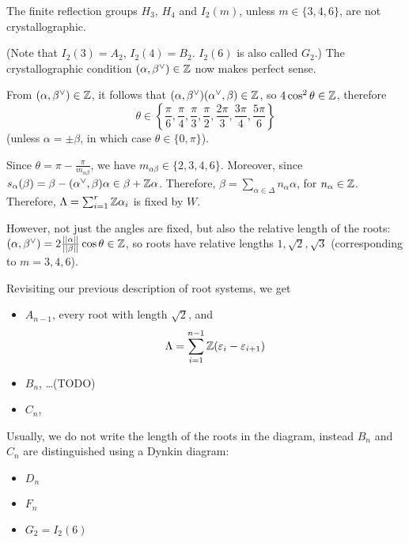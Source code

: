\begin{corollary} \label{cor20}
The finite reflection groups $H_3$, $H_4$ and $I_2(m)$, unless
$m \in \{3,4,6\}$, are not crystallographic.
\end{corollary}

(Note that $I_2(3) = A_2$, $I_2(4) = B_2$. $I_2(6)$ is also called $G_2$.)
The crystallographic condition $(\alpha, \beta^\vee) \in \mathbb{Z}$ now makes perfect
sense.

From $(\alpha, \beta^\vee) \in \mathbb{Z}$, it follows that $(\alpha, \beta^\vee)
(\alpha^\vee, \beta) \in \mathbb{Z}$, so $4 \cos^2 \theta \in \mathbb{Z}$, therefore
\[ \theta \in \left\{\frac{\pi}{6}, \frac{\pi}{4}, \frac{\pi}{3}, \frac{\pi}{2},
\frac{2\pi}{3}, \frac{3\pi}{4}, \frac{5\pi}{6}\right\} \] (unless
$\alpha = \pm \beta$, in which case $\theta \in \{0, \pi\}$).

Since $\theta = \pi - \frac{\pi}{m_{\alpha \beta}}$, we have $m_{\alpha \beta}
\in \{2,3,4,6\}$. Moreover, since $s_\alpha(\beta) = \beta -
(\alpha^\vee, \beta) \alpha \in \beta + \mathbb{Z} \alpha$. Therefore, $\beta
= \sum_{\alpha \in \Delta} n_\alpha \alpha$, for $n_\alpha \in \mathbb{Z}$.
Therefore, $\Lambda = \sum_{i=1}^r \mathbb{Z} \alpha_i$ is fixed by $W$.

However, not just the angles are fixed, but also the relative length of the
roots: $(\alpha, \beta^\vee) = 2\frac{||\alpha||}{||\beta||} \cos \theta \in \mathbb{Z}$,
so roots have relative lengths $1, \sqrt{2}, \sqrt{3}$ (corresponding to
$m = 3, 4, 6$).

Revisiting our previous description of root systems, we get
\begin{itemize}
\item $A_{n-1}$, every root with length $\sqrt{2}$, and
\[ \Lambda = \sum_{i=1}^{n-1} \mathbb{Z} (\varepsilon_i - \varepsilon_{i+1}) \]
\item $B_n$, \dots (TODO) %
\item $C_n$, %
\end{itemize}

Usually, we do not write the length of the roots in the diagram, instead
$B_n$ and $C_n$ are distinguished using a Dynkin diagram: %

\begin{itemize}
\item $D_n$
\item $F_n$
\item $G_2 = I_2(6)$
\end{itemize}
